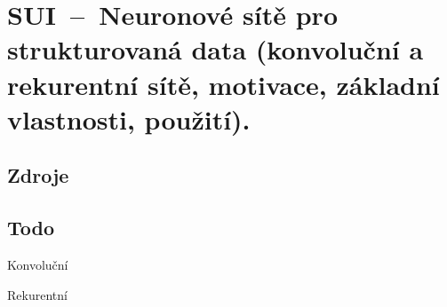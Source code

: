 

\graphicspath{{sui/neuronove_site_pro_strukturovana_data/figures}}


\chapter{SUI~--~Neuronové sítě pro strukturovaná data (konvoluční a rekurentní sítě, motivace, základní vlastnosti, použití).}


\section{Zdroje}

\begin{compactitem}
    \item {}
\end{compactitem}


\section{Todo}

Konvoluční

Rekurentní
